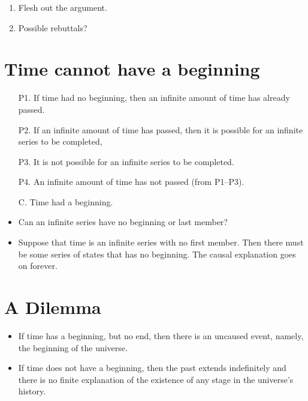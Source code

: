 \documentclass[oneside, 11]{article}
\begin{document}
\begin{enumerate}
\item Flesh out the argument.
\item Possible rebuttals? 
\end{enumerate}

\section*{Time cannot have a beginning}

\begin{itemize}
\item[P1.] If time had no beginning, then an infinite amount of time has already passed. 
\item[P2.] If an infinite amount of time has passed, then it is possible for an infinite series to be completed, 
\item[P3.] It is not possible for an infinite series to be completed. 
\item[P4.] An infinite amount of time has not passed (from P1--P3). 
\item[C.] Time had a beginning. 
\end{itemize}

\begin{itemize}
\item Can an infinite series have no beginning or last member? 
\item Suppose that time is an infinite series with no first member.  Then there must be some series of states that has no beginning.  The causal explanation goes on forever. 
\end{itemize}

\section*{A Dilemma}

\begin{itemize}
\item If time has a beginning, but no end, then there is an uncaused event, namely, the beginning of the universe.  
\item If time does not have a beginning, then the past extends indefinitely and there is no finite explanation of the existence of any stage in the universe's history.  
\end{itemize}
\end{document}
